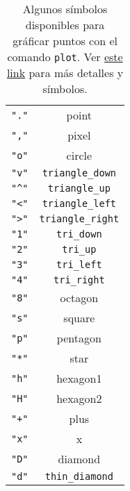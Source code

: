 \documentclass[11pt]{exam}
\begin{document}
\begin{questions}
\begin{table}
\begin{center}
\begin{tabular}{cc}
\verb|"."|	& point \\
\verb|","| & pixel \\
\verb|"o"|	& circle \\
\verb|"v"|	& \verb|triangle_down| \\
\verb|"^"|	& \verb|triangle_up| \\
\verb|"<"|	& \verb|triangle_left| \\
\verb|">"|	& \verb|triangle_right| \\
\verb|"1"|	& \verb|tri_down| \\
\verb|"2"|	& \verb|tri_up| \\
\verb|"3"|	& \verb|tri_left| \\
\verb|"4"|	& \verb|tri_right| \\
\verb|"8"|	& octagon \\
\verb|"s"|	& square \\
\verb|"p"|	& pentagon \\
\verb|"*"|	& star \\
\verb|"h"|	& hexagon1 \\
\verb|"H"|	& hexagon2 \\
\verb|"+"|	& plus \\
\verb|"x"|	& x \\
\verb|"D"|	& diamond \\
\verb|"d"|	& \verb|thin_diamond| 
\end{tabular}
\caption{Algunos símbolos disponibles para gráficar puntos con el comando \texttt{plot}. Ver \href{https://matplotlib.org/stable/api/markers_api.html}{este link} para más detalles y símbolos.}
\label{t}
\end{center}
\end{table}

\end{questions}
\end{document}
